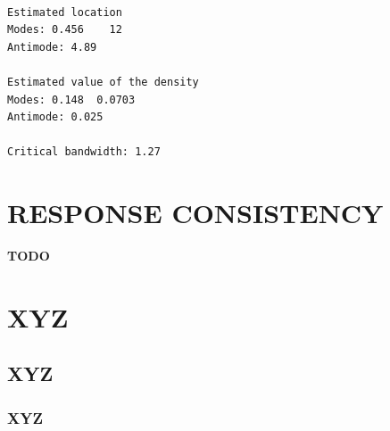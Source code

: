 \documentclass[
  letterpaper,
  DIV=11,
  numbers=noendperiod]{scrreprt}
\begin{document}
\begin{verbatim}

Estimated location
Modes: 0.456    12 
Antimode: 4.89 

Estimated value of the density
Modes: 0.148  0.0703 
Antimode: 0.025 

Critical bandwidth: 1.27
\end{verbatim}

\hypertarget{response-consistency}{%
\section{RESPONSE CONSISTENCY}\label{response-consistency}}

\textbf{TODO}

\hypertarget{xyz}{%
\section{XYZ}\label{xyz}}

\hypertarget{xyz-1}{%
\subsection{XYZ}\label{xyz-1}}

\hypertarget{xyz-2}{%
\subsubsection{XYZ}\label{xyz-2}}
\end{document}
